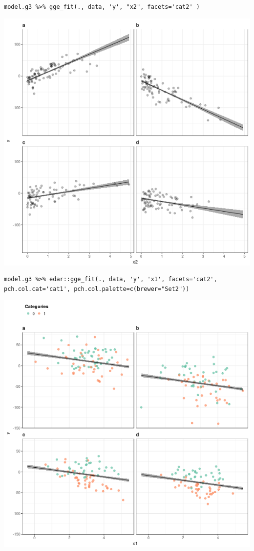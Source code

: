 \documentclass[a4paper]{article}
\begin{document}
\begin{enumerate}
\lstset{numbers=left,language=r,label= ,caption= ,captionpos=b}
\begin{lstlisting}
model.g3 %>% gge_fit(., data, 'y', "x2", facets='cat2' )
\end{lstlisting}

\begin{center}
\includegraphics[width=.9\linewidth]{fig-fiited-cat-3.png}
\end{center}

\lstset{numbers=left,language=r,label= ,caption= ,captionpos=b}
\begin{lstlisting}
model.g3 %>% edar::gge_fit(., data, 'y', 'x1', facets='cat2', pch.col.cat='cat1', pch.col.palette=c(brewer="Set2"))
\end{lstlisting}

\begin{center}
\includegraphics[width=.9\linewidth]{fig-fitted-4.png}
\end{center}


\end{enumerate}
\end{document}
